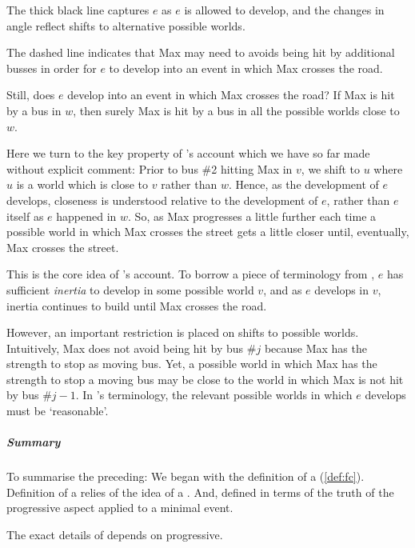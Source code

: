 \begin{note}
  The thick black line captures \(e\) as \(e\) is allowed to develop, and the changes in angle reflect shifts to alternative possible worlds.

  The dashed line indicates that Max may need to avoids being hit by additional busses in order for \(e\) to develop into an event in which Max crosses the road.

  Still, does \(e\) develop into an event in which Max crosses the road?
  If Max is hit by a bus in \(w\), then surely Max is hit by a bus in all the possible worlds close to \(w\).

  Here we turn to the key property of \citeauthor{Landman:1992wh}'s account which we have so far made without explicit comment:
  Prior to bus \#2 hitting Max in \(v\), we shift to \(u\) where \(u\) is a world which is close to \(v\) rather than \(w\).
  Hence, as the development of \(e\) develops, closeness is understood relative to the development of \(e\), rather than \(e\) itself as \(e\) happened in \(w\).
  So, as Max progresses a little further each time a possible world in which Max crosses the street gets a little closer until, eventually, Max crosses the street.

  This is the core idea of \citeauthor{Landman:1992wh}'s account.
  To borrow a piece of terminology from \textcite{Dowty:1979vq}, \(e\) has sufficient \emph{inertia} to develop in some possible world \(v\), and as \(e\) develops in \(v\), inertia continues to build until Max crosses the road.

  However, an important restriction is placed on shifts to possible worlds.
  Intuitively, Max does not avoid being hit by bus \#\(j\) because Max has the strength to stop as moving bus.
  Yet, a possible world in which Max has the strength to stop a moving bus may be close to the world in which Max is not hit by bus \#\(j - 1\).
  In \citeauthor{Landman:1992wh}'s terminology, the relevant possible worlds in which \(e\) develops must be `reasonable'.
\end{note}

\subparagraph*{Summary}

\begin{note}[Summarising]
  To summarise the preceding:
  We began with the definition of a \fc{} (\autoref{def:fc}).
  Definition of a \fc{} relies of the idea of a \pevent{}.
  And, defined \pevent{} in terms of the truth of the progressive aspect applied to a minimal event.

  The exact details of \pevent{} depends on progressive.
\end{note}


